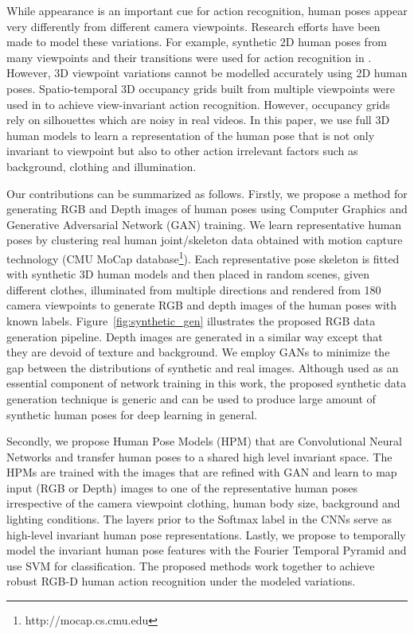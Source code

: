 \documentclass[twocolumn]{svjour3}          \smartqed  \usepackage{graphicx}
\begin{document}
While appearance is an important cue for action recognition, human poses appear very differently from different camera viewpoints. Research efforts have been made to model these variations. For example, synthetic 2D human poses from many viewpoints and their transitions were used for action recognition in \citep{lv2007single}. However, 3D viewpoint variations cannot be modelled accurately using 2D human poses. Spatio-temporal 3D occupancy grids built from multiple viewpoints were used in \citep{weinland2007action} to achieve view-invariant action recognition. However, occupancy grids rely on silhouettes which are noisy in real videos. In this paper, we use full 3D human models to learn a representation of the human pose that is not only invariant to viewpoint but also to other action irrelevant factors such as background, clothing and illumination.





Our contributions can be summarized as follows. Firstly, we propose a method for generating RGB and Depth images of human poses using Computer Graphics and Generative Adversarial Network (GAN) training. We learn representative human poses by clustering real human joint/skeleton data  obtained with motion capture technology (CMU MoCap database\footnote{http://mocap.cs.cmu.edu}). Each representative pose skeleton is fitted with synthetic 3D human models and then placed in random scenes, given different clothes, illuminated from multiple directions and rendered from 180 camera viewpoints to generate RGB and depth images of the human poses with known labels. Figure~\ref{fig:synthetic_gen} illustrates the proposed RGB data generation pipeline. Depth images are generated in a similar way except that they are devoid of texture and background. We employ GANs to minimize the gap between the distributions of  synthetic and real images. Although used as an essential component of network training in this work, the proposed synthetic data generation technique is generic and can be used to produce large amount of synthetic human poses for deep learning in general.

Secondly, we propose Human Pose Models (HPM) that are Convolutional Neural Networks and transfer human poses to a shared high level invariant space. The HPMs are trained with the images that are refined with GAN and learn to map input (RGB or Depth) images to one of the representative human poses irrespective of the camera viewpoint clothing, human body size, background and lighting conditions. The layers prior to the Softmax label in the CNNs serve as high-level invariant human pose representations. Lastly, we propose to temporally model the invariant human pose features with the Fourier Temporal Pyramid and use SVM for classification. The proposed methods work together to achieve robust RGB-D human action recognition under the modeled variations.
\end{document}
